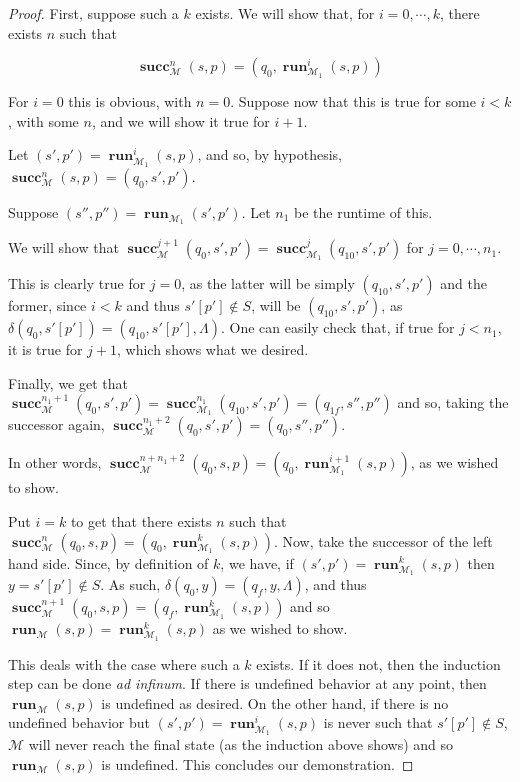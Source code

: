 \documentclass{article}
\newcommand{\M}{\mathcal{M}}
\DeclareMathOperator{\suc}{\mathbf{succ}}
\DeclareMathOperator{\run}{\mathbf{run}}
\begin{document}
	\begin{proof}
	First, suppose such a $k$ exists. We will show that, for $i = 0, \cdots, k$, there exists $n$ such that
	
	\[\suc_\M^n (s,p) = (q_0,  \run_{\M_1}^i (s,p))\]
	
	For $i = 0$ this is obvious, with $n = 0$. Suppose now that this is true for some $i < k$, with some $n$, and we will show it true for $i+1$.
	
	Let $(s', p') = \run_{\M_1}^i (s,p)$, and so, by hypothesis, $\suc_\M^n (s,p) = (q_0, s', p')$.
	
	Suppose $(s'', p'') = \run_{\M_1}(s',p')$. Let $n_1$ be the runtime of this.
	
	We will show that $\suc_\M^{j+1} (q_0, s',p') = \suc_{\M_1}^j (q_{10}, s', p')$ for $j = 0, \cdots, n_1$.
	
	This is clearly true for $j = 0$, as the latter will be simply $(q_{10}, s', p')$ and the former, since $i < k$ and thus $s'[p'] \not \in S$, will be $(q_{10}, s', p')$, as $\delta(q_0, s'[p']) = (q_{10}, s'[p'], \Lambda)$. One can easily check that, if true for $j < n_1$, it is true for $j+1$, which shows what we desired.
	
	Finally, we get that $\suc_\M^{n_1+1} (q_0, s',p') = \suc_{\M_1}^{n_1} (q_{10}, s', p') = (q_{1f}, s'', p'')$ and so, taking the successor again, $\suc_\M^{n_1 + 2}(q_0, s', p') = (q_0, s'', p'')$.
	
	In other words, $\suc_\M^{n + n_1 + 2}(q_0, s, p) = (q_0, \run_{\M_1}^{i+1} (s, p))$, as we wished to show.
	
	Put $i = k$ to get that there exists $n$ such that $\suc_\M^n(q_0, s, p) = (q_0, \run_{\M_1}^k(s, p))$. Now, take the successor of the left hand side. Since, by definition of $k$, we have, if $(s', p') = \run_{\M_1}^k(s, p)$ then $y = s'[p'] \not \in S$. As such, $\delta(q_0, y) = (q_f, y, \Lambda)$, and thus $\suc_\M^{n+1}(q_0, s, p) = (q_f, \run_{\M_1}^k(s, p))$ and so $\run_\M(s, p) = \run_{\M_1}^k (s, p)$ as we wished to show.
	
	This deals with the case where such a $k$ exists. If it does not, then the induction step can be done \textit{ad infinum}. If there is undefined behavior at any point, then $\run_\M(s, p)$ is undefined as desired. On the other hand, if there is no undefined behavior but $(s', p') = \run_{\M_1}^i (s,p)$ is never such that $s'[p'] \not \in S$, $\M$ will never reach the final state (as the induction above shows) and so $\run_\M(s, p)$ is undefined. This concludes our demonstration.
	\end{proof}
	
\end{document}
